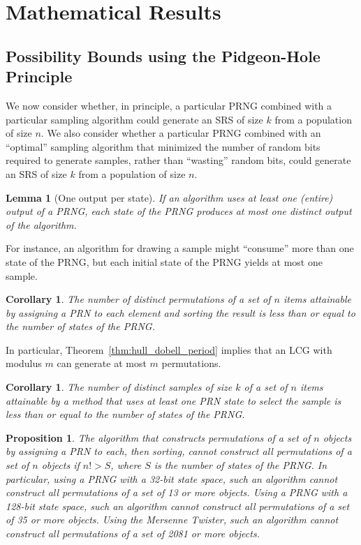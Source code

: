\documentclass[12pt]{article}
\newtheorem{lemma}[theorem]{Lemma}
\newtheorem{corollary}[theorem]{Corollary}
\newtheorem{proposition}[theorem]{Proposition}
\begin{document}
\section{Mathematical Results}
\subsection{Possibility Bounds using the Pidgeon-Hole Principle}
We now consider whether, in principle, a particular PRNG combined with a particular sampling algorithm could generate an SRS of size $k$ from a population of size $n$.
We also consider whether a particular PRNG combined with an ``optimal'' sampling algorithm that minimized the number of random bits required to generate samples, rather than ``wasting'' random bits, could generate an SRS of size $k$ from a population of size $n$.


\begin{lemma}[One output per state]
If an algorithm uses at least one (entire) output of a PRNG, each state of the PRNG produces at most one distinct output of the algorithm.
\end{lemma}

For instance, an algorithm for drawing a sample might ``consume'' more than one state of the PRNG, but each initial state of the PRNG yields at most one sample.

\begin{corollary}
The number of distinct permutations of a set of $n$ items attainable by assigning a PRN to each element and sorting the result is less than or equal to the number of states of the PRNG.
\end{corollary}

In particular, Theorem~\ref{thm:hull_dobell_period} implies that an LCG with modulus $m$ can generate at most $m$ permutations.


\begin{corollary}
The number of distinct samples of size $k$ of a set of $n$ items attainable by a method that uses at least one PRN state to select the sample is less than or equal to the number of states of the PRNG.
\end{corollary}

\begin{proposition}
The algorithm that constructs permutations of a set of $n$ objects by assigning a PRN to each, then sorting, cannot construct all permutations of a set of $n$ objects if $n! > S$, where $S$ is the number of states of the PRNG. 
In particular, using a PRNG with a 32-bit state space, such an algorithm cannot construct all permutations of a set of 13 or more objects.
Using a PRNG with a 128-bit state space, such an algorithm cannot construct all permutations of a set of 35 or more objects.
Using the Mersenne Twister, such an algorithm cannot construct all permutations of a set of 2081 or more objects.
\end{proposition}
\end{document}
